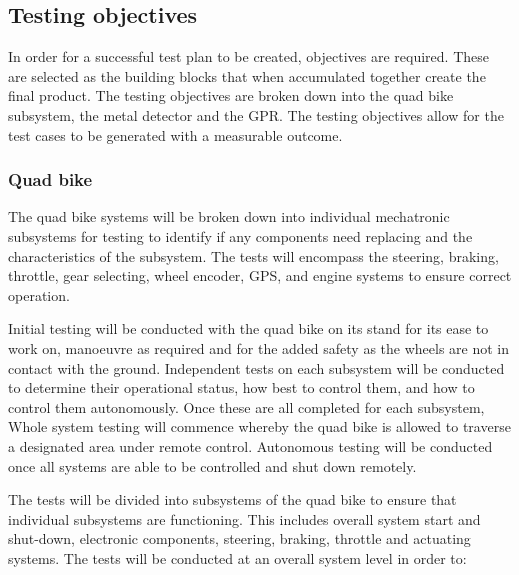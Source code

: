 \documentclass[main.tex]{subfiles}
\begin{document}
\begin{appendices}
\subsection{Testing objectives}
In order for a successful test plan to be created, objectives are required. These are selected as the building blocks that when accumulated together create the final product. The testing objectives are broken down into the quad bike subsystem, the metal detector and the GPR. The testing objectives allow for the test cases to be generated with a measurable outcome.

\subsubsection{Quad bike}
The quad bike systems will be broken down into individual mechatronic subsystems for testing to identify if any components need replacing and the characteristics of the subsystem. The tests will encompass the steering, braking, throttle, gear selecting, wheel encoder, GPS, and engine systems to ensure correct operation.

\medskip\noindent
Initial testing will be conducted with the quad bike on its stand for its ease to work on, manoeuvre as required and for the added safety as the wheels are not in contact with the ground. Independent tests on each subsystem will be conducted to determine their operational status, how best to control them, and how to control them autonomously. Once these are all completed for each subsystem, Whole system testing will commence whereby the quad bike is allowed to traverse a designated area under remote control. Autonomous testing will be conducted once all systems are able to be controlled and shut down remotely.

\medskip\noindent
The tests will be divided into subsystems of the quad bike to ensure that individual subsystems are functioning. This includes overall system start and shut-down, electronic components, steering, braking, throttle and actuating systems. The tests will be conducted at an overall system level in order to:


\end{appendices}
\end{document}
